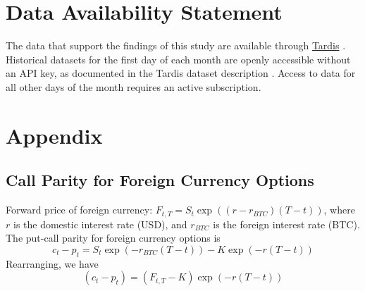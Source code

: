 \documentclass[12pt]{article}
\begin{document}
\section*{Data Availability Statement}

The data that support the findings of this study are available through
\href{https://tardis.dev/}{Tardis} \citep{tardis_main}. Historical datasets for the first day of each month are openly accessible without an API key, as documented in the Tardis dataset description \cite{tardis_main,turn3search3}. Access to data for all other days of the month requires an active subscription.



\section{Appendix}

\subsection{ Call Parity for Foreign Currency Options}

Forward price of foreign currency: $F_{t,T} = S_t \exp\left((r - r_{BTC})(T-t)\right)$, where $r$ is the domestic interest rate (USD), and $r_{BTC}$ is the foreign interest rate (BTC). The put-call parity for foreign currency options is
\begin{equation}
c_t - p_t = S_t \exp\left(-r_{BTC}(T-t)\right) - K \exp\left(-r(T-t)\right)
\end{equation}
Rearranging, we have
\begin{equation}(c_t - p_t) = (F_{t,T} - K)\exp\left(-r(T-t)\right)
\end{equation}\citet{Hull}
\end{document}
